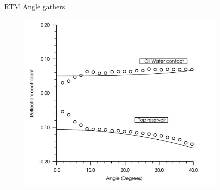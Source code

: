 \documentclass[xcolor=dvipsnames,notes]{beamer}
\begin{document}
\begin{frame}{RTM Angle gathers}
\begin{figure}
\includegraphics[width=0.9\textwidth]{Fig/fig15.pdf}
\end{figure}
\end{frame}
\end{document}

